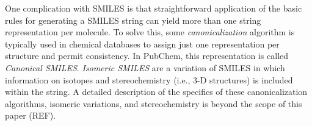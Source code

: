 One complication with SMILES is that straightforward application of the basic rules for generating a SMILES string can yield more than one string representation per molecule. To solve this, some {\em canonicalization} algorithm is typically used in chemical databases to  assign just one representation per structure and permit consistency. In PubChem, this representation is called {\em Canonical SMILES}. 
{\em Isomeric SMILES} are a variation of SMILES in which information on isotopes and stereochemistry (i.e., 3-D structures) is included within the string. A detailed description of the specifics of these canonicalization algorithms, isomeric variations, and stereochemistry is beyond the scope of this paper (REF). 
%

